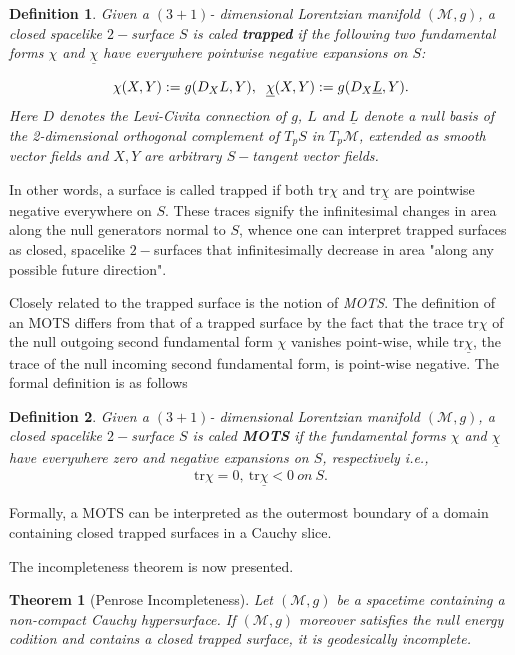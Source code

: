 \documentclass{amsart}
\newtheorem{definition}{Definition}
\newtheorem{theorem}{Theorem}[section]
\newcommand{\Lbar}{\underline{L}}
\newcommand{\chibar}{\underline{\chi}}
\newcommand{\tr}{\mbox{tr}}
\begin{document}
\begin{definition}
Given a $(3+1)$- dimensional Lorentzian manifold $(\mathcal{M}, g)$, a closed spacelike $2-$surface $S$ is caled \textbf{trapped} if the following two fundamental forms $\chi$ and $\chibar$ have everywhere pointwise negative expansions on $S$:

\[  \chi(X,Y) := g(D_X L, Y), \hspace{2mm} \chibar(X, Y) := g(D_X \Lbar, Y).    \]Here $D$ denotes the Levi-Civita connection of $g$, $L$ and $\Lbar$ denote a null basis of the 2-dimensional orthogonal complement of $T_p S$ in $T_p \mathcal{M}$, extended as smooth vector fields and $X, Y$ are arbitrary $S-$tangent vector fields. 
\end{definition}
\noindent In other words, a surface is called trapped if both $\tr\chi$ and $\tr\chibar$ are pointwise negative everywhere on $S$. These traces signify the infinitesimal changes in area along the null generators normal to $S$, whence one can interpret trapped surfaces as closed, spacelike $2-$surfaces that infinitesimally decrease in area "along any possible future direction". 

\noindent Closely related to the trapped surface is the notion of \textit{MOTS}. The definition of an MOTS differs from that of a trapped surface by the fact that the trace $\tr\chi$ of the null outgoing second fundamental form $\chi$ vanishes point-wise, while $\tr\chibar$, the trace of the null incoming second fundamental form, is point-wise negative. The formal definition is as follows 
\begin{definition}
Given a $(3+1)$- dimensional Lorentzian manifold $(\mathcal{M}, g)$, a closed spacelike $2-$surface $S$ is caled \textbf{MOTS} if the fundamental forms $\chi$ and $\chibar$ have everywhere zero and negative expansions on $S$, respectively i.e., 
\begin{align}
 \tr\chi=0,~\tr\chibar<0~on~S.   
\end{align}
\end{definition}
\noindent Formally, a MOTS can be interpreted as the outermost boundary of a domain containing closed trapped surfaces in a Cauchy slice. 

\par\noindent The incompleteness theorem is now presented.

\begin{theorem}[Penrose Incompleteness] Let $(\mathcal{M} ,g)$ be a spacetime containing a non-compact Cauchy hypersurface. If $(\mathcal{M}, g)$ moreover satisfies the null energy codition and contains a closed trapped surface, it is geodesically incomplete. 

\end{theorem}
\end{document}
